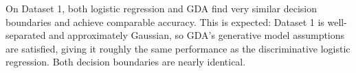 \begin{answer}
On Dataset 1, both logistic regression and GDA find very similar decision boundaries and achieve comparable accuracy. This is expected: Dataset 1 is well-separated and approximately Gaussian, so GDA's generative model assumptions are satisfied, giving it roughly the same performance as the discriminative logistic regression. Both decision boundaries are nearly identical.
\end{answer}
